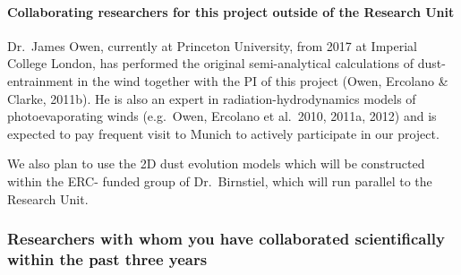\documentclass[10pt,fleqn,twoside]{article}
\begin{document}
\paragraph{Collaborating researchers for this project outside of
  the Research Unit}


Dr.\ James Owen, currently at Princeton University, from 2017 at
Imperial College London, has performed the original semi-analytical
calculations of dust-entrainment in the wind together with the PI of
this project (Owen, Ercolano \& Clarke, 2011b). He is also an expert
in radiation-hydrodynamics models of photoevaporating winds
(e.g.\ Owen, Ercolano et al.\ 2010, 2011a, 2012) and is expected to pay
frequent visit to Munich to actively participate in our project. 

We also plan to use the 2D dust evolution models which will be
constructed within the ERC- funded group of Dr.\ Birnstiel, which
will run parallel to the Research Unit. 

\subsubsection{Researchers with whom you have collaborated scientifically within the past three years}

\end{document}
